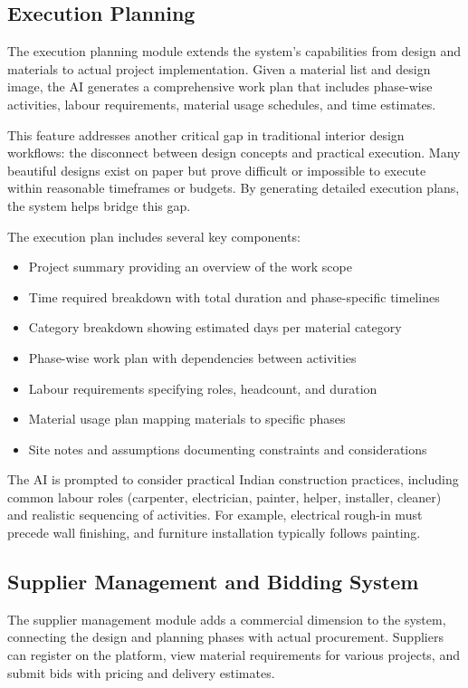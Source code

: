 \documentclass[conference]{IEEEtran}
\begin{document}
\subsection{Execution Planning}
The execution planning module extends the system's capabilities from design and materials to actual project implementation. Given a material list and design image, the AI generates a comprehensive work plan that includes phase-wise activities, labour requirements, material usage schedules, and time estimates.

This feature addresses another critical gap in traditional interior design workflows: the disconnect between design concepts and practical execution. Many beautiful designs exist on paper but prove difficult or impossible to execute within reasonable timeframes or budgets. By generating detailed execution plans, the system helps bridge this gap.

The execution plan includes several key components:
\begin{itemize}
    \item Project summary providing an overview of the work scope
    \item Time required breakdown with total duration and phase-specific timelines
    \item Category breakdown showing estimated days per material category
    \item Phase-wise work plan with dependencies between activities
    \item Labour requirements specifying roles, headcount, and duration
    \item Material usage plan mapping materials to specific phases
    \item Site notes and assumptions documenting constraints and considerations
\end{itemize}

The AI is prompted to consider practical Indian construction practices, including common labour roles (carpenter, electrician, painter, helper, installer, cleaner) and realistic sequencing of activities. For example, electrical rough-in must precede wall finishing, and furniture installation typically follows painting.

\subsection{Supplier Management and Bidding System}
The supplier management module adds a commercial dimension to the system, connecting the design and planning phases with actual procurement. Suppliers can register on the platform, view material requirements for various projects, and submit bids with pricing and delivery estimates.
\end{document}
